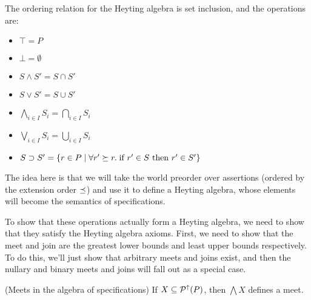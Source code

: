 The ordering relation for the Heyting algebra is set inclusion, and
the operations are:

\begin{itemize}
\item $\top = P$
\item $\bot = \emptyset$
\item $S \land S' = S \cap S'$
\item $S \vee S' = S \cup S'$
\item $\bigwedge_{i \in I} S_i = \bigcap_{i \in I} S_i$
\item $\bigvee_{i \in I} S_i = \bigcup_{i \in I} S_i$
\item $S \supset S' = \{ r \in P \;|\; \forall r' \succeq r.\; 	
                          \mbox{if } r' \in S \mbox{ then } r' \in S' \}$
\end{itemize}

The idea here is that we will take the world preorder over assertions
(ordered by the extension order $\preceq$) and use it to define a 
Heyting algebra, whose elements will become the semantics of specifications.


To show that these operations actually form a Heyting algebra, we need
to show that they satisfy the Heyting algebra axioms. First, we need
to show that the meet and join are the greatest lower bounds and least
upper bounds respectively. To do this, we'll just show that arbitrary
meets and joins exist, and then the nullary and binary meets and joins
will fall out as a special case.

\begin{lemma}{(Meets in the algebra of specifications)}
If $X \subseteq \mathcal{P}^{\uparrow}({P})$, then $\bigwedge X$ defines a meet. 
\end{lemma}

